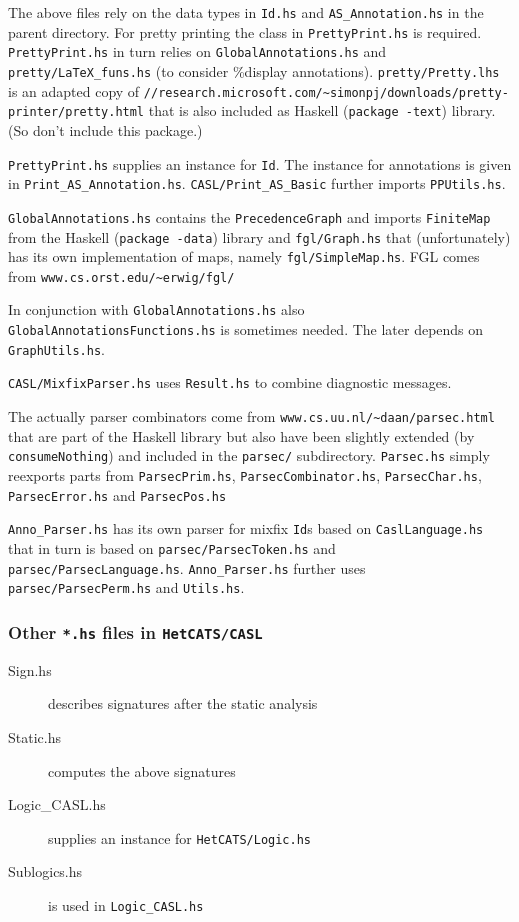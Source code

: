 \documentclass{article}
\begin{document}
The above files rely on the data types in \texttt{Id.hs} and
\texttt{AS\_Annotation.hs} in the parent directory. For pretty
printing the class in \texttt{PrettyPrint.hs} is required.
\texttt{PrettyPrint.hs} in turn relies on
\texttt{GlobalAnnotations.hs} and
\texttt{pretty/LaTeX\_funs.hs} (to consider \%display
annotations). \texttt{pretty/Pretty.lhs} is an adapted copy of
\texttt{//research.microsoft.com/\~{}simonpj/downloads/pretty-printer/pretty.html}
that is also included as Haskell (\texttt{package -text}) library. (So
don't include this package.)

\texttt{PrettyPrint.hs} supplies an instance for \texttt{Id}. The
instance for annotations is given in \texttt{Print\_AS\_Annotation.hs}.
\texttt{CASL/Print\_AS\_Basic} further imports \texttt{PPUtils.hs}.

\texttt{GlobalAnnotations.hs} contains the \texttt{PrecedenceGraph} and
imports \texttt{FiniteMap} from the Haskell (\texttt{package -data})
library and \texttt{fgl/Graph.hs} that (unfortunately) has its
own implementation of maps, namely
\texttt{fgl/SimpleMap.hs}. 
FGL comes from \texttt{www.cs.orst.edu/\~{}erwig/fgl/}

In conjunction with \texttt{GlobalAnnotations.hs} also
\texttt{GlobalAnnotationsFunctions.hs} is sometimes needed. The later
depends on \texttt{GraphUtils.hs}. 

\texttt{CASL/MixfixParser.hs} uses \texttt{Result.hs} to combine
diagnostic messages.

The actually parser combinators come from 
\texttt{www.cs.uu.nl/\~{}daan/parsec.html} that are part of the
Haskell library but also have been slightly extended (by
\texttt{consumeNothing}) and included in the \texttt{parsec/}
subdirectory. \texttt{Parsec.hs} simply reexports parts from
\texttt{ParsecPrim.hs}, \texttt{ParsecCombinator.hs},
\texttt{ParsecChar.hs}, \texttt{ParsecError.hs} and
\texttt{ParsecPos.hs}

\texttt{Anno\_Parser.hs} has its own parser for mixfix \texttt{Id}s based on
\texttt{CaslLanguage.hs} that in turn is based on
\texttt{parsec/ParsecToken.hs} and \texttt{parsec/ParsecLanguage.hs}.
\texttt{Anno\_Parser.hs} further uses \texttt{parsec/ParsecPerm.hs}
and \texttt{Utils.hs}.

\subsubsection*{Other \texttt{*.hs} files in \texttt{HetCATS/CASL}}

\begin{description}
\item[Sign.hs] describes signatures after the static analysis
\item[Static.hs] computes the above signatures
\item[Logic\_CASL.hs] supplies an instance for \texttt{HetCATS/Logic.hs}
\item[Sublogics.hs] is used in \texttt{Logic\_CASL.hs}
\end{description}
 
\end{document}
